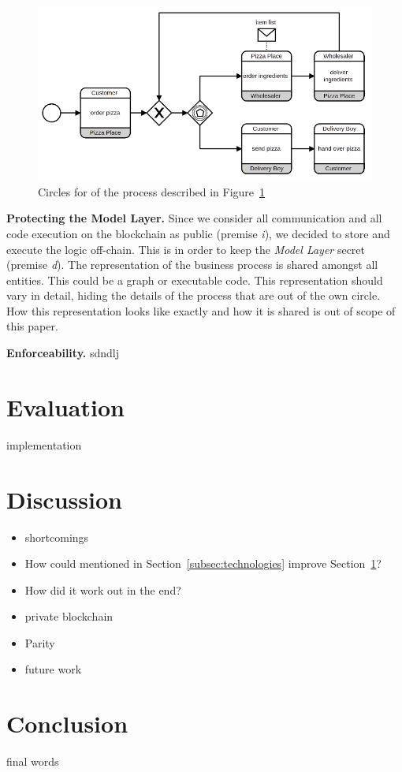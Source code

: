 \documentclass[runningheads]{llncs}
\newcommand{\ber}[1]{\textit{#1}}
\newcommand{\reffig}[1]{Figure~\ref{#1}}
\newcommand{\refsec}[1]{Section~\ref{#1}}
\begin{document}
\begin{figure}[h!]
    \centering
    \includegraphics[scale=0.6]{bpmn.png}
    \caption{Circles for of the process described in \reffig{fig:circles}} 
    \label{fig:circles}
\end{figure}



\bigbreak
\textbf{Protecting the Model Layer.} Since we consider all communication and all code execution on the blockchain as public (premise \ber{i}), we decided to store and execute the logic off-chain. This is in order to keep the \ber{Model Layer} secret (premise \ber{d}). The representation of the business process is shared amongst all entities. This could be a graph or executable code. This representation should vary in detail, hiding the details of the process that are out of the own circle. How this representation looks like exactly and how it is shared is out of scope of this paper.


\bigbreak
\textbf{Enforceability.} sdndlj





\section{Evaluation} \label{sec:eval}

implementation


\section{Discussion} \label{sec:discussion}

\begin{itemize}
    \item shortcomings
    \item How could mentioned in \refsec{subsec:technologies} improve \refsec{sec:eval}?
    \item How did it work out in the end? 
    \item private blockchain
    \item Parity
    \item future work
\end{itemize}


\section{Conclusion} \label{sec:conclusion}

final words




\end{document}
